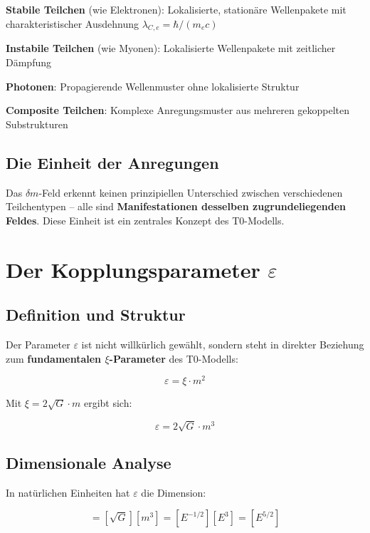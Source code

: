 \documentclass[12pt,a4paper]{report}
\begin{document}
	\textbf{Stabile Teilchen} (wie Elektronen): Lokalisierte, stationäre Wellenpakete mit charakteristischer Ausdehnung $\lambda_{C,e} = \hbar/(m_e c)$
	
	\textbf{Instabile Teilchen} (wie Myonen): Lokalisierte Wellenpakete mit zeitlicher Dämpfung
	
	\textbf{Photonen}: Propagierende Wellenmuster ohne lokalisierte Struktur
	
	\textbf{Composite Teilchen}: Komplexe Anregungsmuster aus mehreren gekoppelten Substrukturen
	
	\subsection{Die Einheit der Anregungen}
	
	Das $\delta m$-Feld erkennt keinen prinzipiellen Unterschied zwischen verschiedenen Teilchentypen -- alle sind \textbf{Manifestationen desselben zugrundeliegenden Feldes}. Diese Einheit ist ein zentrales Konzept des T0-Modells.
	
	\section{Der Kopplungsparameter $\varepsilon$}
	
	\subsection{Definition und Struktur}
	
	Der Parameter $\varepsilon$ ist nicht willkürlich gewählt, sondern steht in direkter Beziehung zum \textbf{fundamentalen $\xi$-Parameter} des T0-Modells:
	
	\begin{equation}
		\varepsilon = \xi \cdot m^2
	\end{equation}
	
	Mit $\xi = 2\sqrt{G} \cdot m$ ergibt sich:
	
	\begin{equation}
		\varepsilon = 2\sqrt{G} \cdot m^3
	\end{equation}
	
	\subsection{Dimensionale Analyse}
	
	In natürlichen Einheiten hat $\varepsilon$ die Dimension:
	
	\begin{equation}
		[\varepsilon] = [\sqrt{G}][m^3] = [E^{-1/2}][E^3] = [E^{5/2}]
	\end{equation}
	
\end{document}
